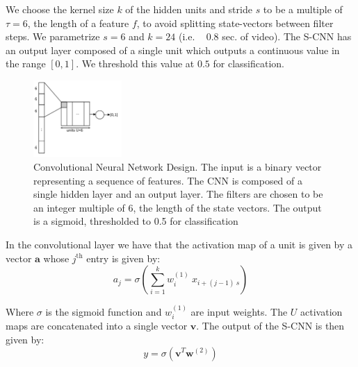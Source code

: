 \documentclass[10pt,twocolumn,letterpaper]{article}
\begin{document}
We choose the kernel size $k$ of the hidden units and stride $s$ to be a multiple of $\tau=6$, the length of a feature $f$, to avoid splitting state-vectors between filter steps. We parametrize $s=6$ and $k=24$ (i.e. ~ 0.8 sec. of video). The S-CNN has an output layer composed of a single unit which outputs a continuous value in the range $[0,1]$. We threshold this value at $0.5$ for classification. 

\begin{figure}
       \centering
       \includegraphics[width=0.3\textwidth]{figures/network.png}  
        \caption{Convolutional Neural Network Design. The input is a binary vector representing a sequence of features. The CNN is composed of a single hidden layer and an output layer. The filters are chosen to be an integer multiple of 6, the length of the state vectors. The output is a sigmoid, thresholded to 0.5 for classification}
              \label{fig:conv}
\end{figure}


In the convolutional layer we have that the activation map of a unit is given by a vector $\textbf{a}$ whose $j^{\text{th}}$ entry is given by:
\begin{equation}
a_{j} = \sigma \left (\sum_{i=1}^{k}{w_{i}^{(1)} \: x_{i + (j-1)\:s}} \right )
\end{equation}

Where $\sigma$ is the sigmoid function and $w_i^{(1)}$ are input weights. The $U$ activation maps are concatenated into a single vector $\textbf{v}$. The output of the S-CNN is then given by:
\begin{equation}
y = \sigma \left (\textbf{v}^T \textbf{w}^{(2)} \right )
\end{equation}
\end{document}
